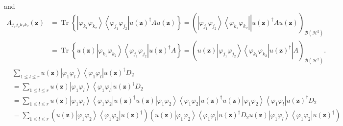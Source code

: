\documentclass[aps,preprint]{revtex4}%
\begin{document}
and
\begin{align}
A_{j_{1}j_{2}k_{1}k_{2}}\left(  \mathbf{z}\right)   &  =\operatorname*{Tr}%
\left\{  \left\vert \varphi_{k_{1}}\varphi_{k_{2}}\right\rangle \left\langle
\varphi_{j_{1}}\varphi_{j_{2}}\right\vert u\left(  \mathbf{z}\right)
^{\dagger}Au\left(  \mathbf{z}\right)  \right\}  =\left(  \left.
\overset{}{\left\vert \varphi_{j_{1}}\varphi_{j_{2}}\right\rangle \left\langle
\varphi_{k_{1}}\varphi_{k_{2}}\right\vert }\right\vert u\left(  \mathbf{z}%
\right)  ^{\dagger}Au\left(  \mathbf{z}\right)  \right)  _{\mathcal{B}\left(
\mathcal{H}^{2}\right)  }\nonumber\\
&  =\operatorname*{Tr}\left\{  u\left(  \mathbf{z}\right)  \left\vert
\varphi_{k_{1}}\varphi_{k_{2}}\right\rangle \left\langle \varphi_{j_{1}%
}\varphi_{j_{2}}\right\vert u\left(  \mathbf{z}\right)  ^{\dagger}A\right\}
=\left(  \left.  \overset{}{u\left(  \mathbf{z}\right)  \left\vert
\varphi_{j_{1}}\varphi_{j_{2}}\right\rangle \left\langle \varphi_{k_{1}%
}\varphi_{k_{2}}\right\vert u\left(  \mathbf{z}\right)  ^{\dagger}}\right\vert
A\right)  _{\mathcal{B}\left(  \mathcal{H}^{2}\right)  }.
\end{align}%
\begin{align}
&  \sum_{1\leq l\leq r}u\left(  \mathbf{z}\right)  \left\vert \varphi
_{1}\varphi_{l}\right\rangle \left\langle \varphi_{1}\varphi_{l}\right\vert
u\left(  \mathbf{z}\right)  ^{\dagger}D_{2}\\
&  =\sum_{1\leq l\leq r}u\left(  \mathbf{z}\right)  \left\vert \varphi
_{1}\varphi_{l}\right\rangle \left\langle \varphi_{1}\varphi_{l}\right\vert
u\left(  \mathbf{z}\right)  ^{\dagger}D_{2}\\
&  =\sum_{1\leq l\leq r}u\left(  \mathbf{z}\right)  \left\vert \varphi
_{1}\varphi_{l}\right\rangle \left\langle \varphi_{1}\varphi_{2}\right\vert
u\left(  \mathbf{z}\right)  ^{\dagger}u\left(  \mathbf{z}\right)  \left\vert
\varphi_{1}\varphi_{2}\right\rangle \left\langle \varphi_{1}\varphi
_{2}\right\vert u\left(  \mathbf{z}\right)  ^{\dagger}u\left(  \mathbf{z}%
\right)  \left\vert \varphi_{1}\varphi_{2}\right\rangle \left\langle
\varphi_{1}\varphi_{l}\right\vert u\left(  \mathbf{z}\right)  ^{\dagger}%
D_{2}\\
&  =\sum_{1\leq l\leq r}\left(  u\left(  \mathbf{z}\right)  \left\vert
\varphi_{1}\varphi_{2}\right\rangle \left\langle \varphi_{1}\varphi
_{2}\right\vert u\left(  \mathbf{z}\right)  ^{\dagger}\right)  \left(
u\left(  \mathbf{z}\right)  \left\vert \varphi_{1}\varphi_{2}\right\rangle
\left\langle \varphi_{1}\varphi_{l}\right\vert u\left(  \mathbf{z}\right)
^{\dagger}D_{2}u\left(  \mathbf{z}\right)  \left\vert \varphi_{1}\varphi
_{l}\right\rangle \left\langle \varphi_{1}\varphi_{2}\right\vert u\left(
\mathbf{z}\right)  ^{\dagger}\right)
\end{align}%
\end{document}
